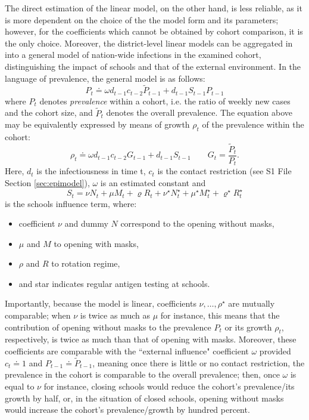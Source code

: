 \documentclass[fleqn,10pt]{wlscirep}
\def\supfile{S1 File\,}
\begin{document}
The direct estimation of the linear model, on the other hand, is less reliable, as it is more dependent on the choice of the the model form and its parameters; however, for the coefficients which cannot be obtained by cohort comparison, it is the only choice. 
Moreover, the district-level linear models can be aggregated in into a general model of nation-wide infections in the examined cohort, distinguishing the impact of schools and that of the external environment. In the language of prevalence, the general model is as follows:
\begin{equation}
P_t
\doteq \omega d_{t-1} c_{t-2}  \tilde P_{t-1}
 + d_{t-1} S_{t-1} P_{t-1}
\label{eq:prevalence}
\end{equation}
where $P_t$ denotes {\em prevalence} within a cohort, i.e. the ratio of weekly new cases and the cohort size, and $\tilde P_t$ denotes the overall prevalence. The equation above may be equivalently expressed by means of growth $\rho_t$ of the prevalence within the cohort:
\begin{equation}
\rho_t \doteq \omega d_{t-1} c_{t-2} G_{t-1} + d_{t-1} S_{t-1}
\qquad G_t = \frac{\tilde P_t}{P_t}.
\label{eq:rhodef}
\end{equation}
Here, $d_t$ is the infectiousness in time t, $c_t$ is the contact restriction (see \supfile Section \ref{sec:epimodel}), $\omega$ is an estimated constant and 
\begin{equation}
S_t = \nu N_{t} + \mu M_{t} + \varrho R_{t} + \nu^\star N^\star_{t}
+ \mu^\star M^{\star}_{t} + \varrho^\star R^\star_{t} 
\label{eq:sdef}
\end{equation}
is the schools influence term, where:
\begin{itemize}
\item coefficient $\nu$ and dummy $N$ correspond to the opening without masks, 
\item $\mu$ and $M$ to opening with masks, 
\item $\rho$ and $R$ to rotation regime, 
\item and star indicates regular antigen testing at schools. 
\end{itemize}
Importantly, because the model is linear, coefficients $\nu, \dots,\rho^\star$ are mutually comparable; when $\nu$ is twice as much as $\mu$ for instance, this means that the contribution of opening without masks to the prevalence $P_t$ or its growth $\rho_t$, respectively, is twice as much than that of opening with masks. Moreover, these coefficients are comparable with the ``external influence" coefficient $\omega$ provided $c_t \doteq 1$ and $P_{t-1}\doteq \tilde P_{t-1}$, meaning once there is little or no contact restriction, the prevalence in the cohort is comparable to the overall prevalence; then, once $\omega$ is equal to $\nu$ for instance, closing schools would reduce the cohort’s prevalence/its growth by half, or, in the situation of closed schools, opening without masks would increase the cohort’s prevalence/growth by hundred percent. 
\end{document}
